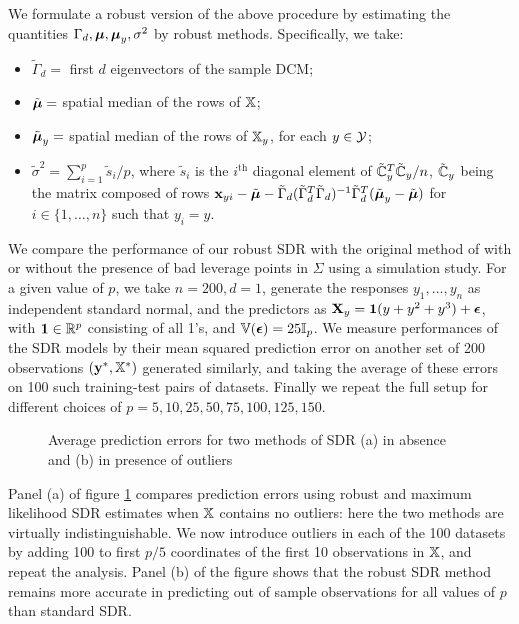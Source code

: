 We formulate a robust version of the above procedure by estimating the quantities $\Gamma_d, {\boldsymbol{\mu}}, {\boldsymbol{\mu}}_y, \sigma^2$ by robust methods. Specifically, we take:
%
\begin{itemize}
\item $\tilde \Gamma_d = $ first $d$ eigenvectors of the sample DCM;
%
\item $\tilde {{\boldsymbol{\mu}}} = $ spatial median of the rows of ${\mathbb{X}}$;
%
\item $\tilde {{\boldsymbol{\mu}}}_y = $ spatial median of the rows of ${\mathbb{X}}_y$, for each $y \in \mathcal{Y}$;
%
\item $\tilde\sigma^2 = \sum_{i=1}^p \tilde s_i/p$, where $\tilde s_i$ is the $i^\text{th}$ diagonal element of $\tilde {{\mathbb{C}}}_y^T \tilde {{\mathbb{C}}}_y/n$, $\tilde {{\mathbb{C}}}_y$ being the matrix composed of rows ${\bf{x}}_{yi} - \tilde {{\boldsymbol{\mu}}} - \tilde \Gamma_d (\tilde \Gamma_d^T \tilde \Gamma_d)^{-1} \tilde \Gamma_d^T (\tilde {{\boldsymbol{\mu}}}_y - \tilde {{\boldsymbol{\mu}}} )$ for $i \in \{ 1, \ldots, n \}$ such that $y_i = y$.
\end{itemize}
%
We compare the performance of our robust SDR with the original method of \cite{AdragniCook09} with or without the presence of bad leverage points in $\Sigma$ using a simulation study. For a given value of $p$, we take $n=200, d=1$, generate the responses $y_1, \ldots, y_n$ as independent standard normal, and the predictors as ${\mathbf{X}}_y = {\bf 1} (y + y^2 + y^3) + {\boldsymbol{\epsilon}}$, with ${\bf 1} \in {\mathbb{R}}^p$ consisting of all 1's, and ${\mathbb{V}}({\boldsymbol{\epsilon}}) = 25 {\mathbb{I}}_p$. We measure performances of the SDR models by their mean squared prediction error on another set of 200 observations $({\bf{y}}^*, {\mathbb{X}}^*)$ generated similarly, and taking the average of these errors on 100 such training-test pairs of datasets. Finally we repeat the full setup for different choices of $p = 5,10,25,50,75,100,125,150$.

\begin{figure}[t]
\begin{center}
\caption{Average prediction errors for two methods of SDR (a) in absence and (b) in presence of outliers}
\label{fig:SDRfig}
\end{center}
\end{figure}

Panel (a) of figure \ref{fig:SDRfig} compares prediction errors using robust and maximum likelihood SDR estimates when ${\mathbb{X}}$ contains no outliers: here the two methods are virtually indistinguishable. We now introduce outliers in each of the 100 datasets by adding 100 to first $p/5$ coordinates of the first 10 observations in ${\mathbb{X}}$, and repeat the analysis. Panel (b) of the figure shows that the robust SDR method remains more accurate in predicting out of sample observations for all values of $p$ than standard SDR.

